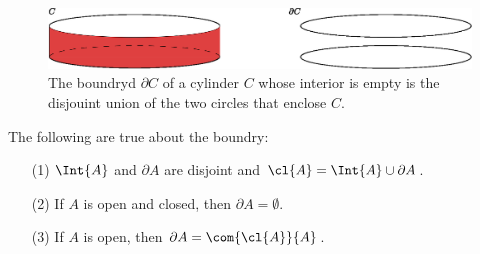 \begin{figure}[h]
    \centering
    \includegraphics[scale=0.5]{Figures/Chapter1/boundry_cylinder.eps}
    \caption{The boundryd $\partial{C}$ of a cylinder $C$ whose interior is
    empty is the disjouint union of the two circles that enclose $C$.}
    \label{fig_1.9}
\end{figure}

\begin{example}\label{1.18}
    The following are true about the boundry:
    \begin{enumerate}
        \item[(1)] $\Int{A}$ and $\partial{A}$ are disjoint and $\cl{A}=\Int{A}
            \cup \partial{A}$.

        \item[(2)] If $A$ is open and closed, then $\partial{A}=\emptyset$.

        \item[(3)] If $A$ is open, then  $\partial{A}=\com{\cl{A}}{A}$.
    \end{enumerate}
\end{example}
